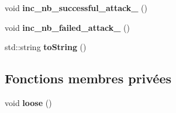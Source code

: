 \begin{DoxyCompactItemize}
\item 
\hypertarget{classFaction_a3d92bdbf463e4bd24824d058d58966f4}{void {\bfseries inc\-\_\-nb\-\_\-successful\-\_\-attack\-\_\-} ()}\label{classFaction_a3d92bdbf463e4bd24824d058d58966f4}

\item 
\hypertarget{classFaction_a29fcb8a676a70b4d0981546bf928bf73}{void {\bfseries inc\-\_\-nb\-\_\-failed\-\_\-attack\-\_\-} ()}\label{classFaction_a29fcb8a676a70b4d0981546bf928bf73}

\item 
\hypertarget{classFaction_a75e7b414c89b8a4d75bf4a778e844b74}{std\-::string {\bfseries to\-String} ()}\label{classFaction_a75e7b414c89b8a4d75bf4a778e844b74}

\end{DoxyCompactItemize}
\subsection*{Fonctions membres privées}
\begin{DoxyCompactItemize}
\item 
\hypertarget{classFaction_a42126a50ecffb27e1fcb4c6f2bb03e4b}{void {\bfseries loose} ()}\label{classFaction_a42126a50ecffb27e1fcb4c6f2bb03e4b}

\end{DoxyCompactItemize}
